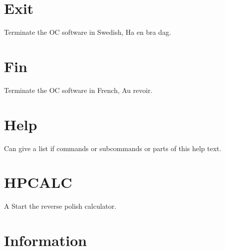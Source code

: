 \documentclass[12pt]{article}
\begin{document}
\section{Exit }

Terminate the OC software in Swedish, Ha en bra dag.

\section{Fin }

Terminate the OC software in French, Au revoir.

\section{Help }

Can give a list if commands or subcommands or parts of this help text.

\section{HPCALC }

A Start the reverse polish calculator.

\section{Information }
\end{document}

